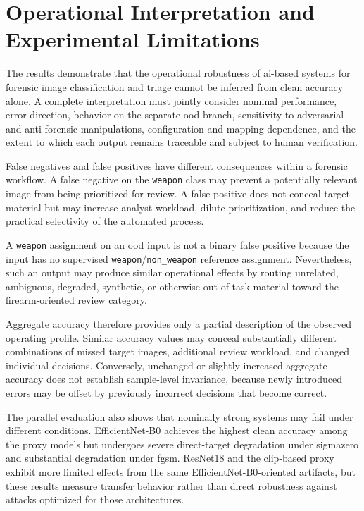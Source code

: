 \section{Operational Interpretation and Experimental Limitations}
\label{sec:results-limitations}

The results demonstrate that the operational robustness of \gls{ai}-based
systems for forensic image classification and triage cannot be inferred from
clean accuracy alone. A complete interpretation must jointly consider nominal
performance, error direction, behavior on the separate \gls{ood} branch,
sensitivity to adversarial and anti-forensic manipulations, configuration and
mapping dependence, and the extent to which each output remains traceable and
subject to human verification.

False negatives and false positives have different consequences within a
forensic workflow. A false negative on the \texttt{weapon} class may prevent a
potentially relevant image from being prioritized for review. A false positive
does not conceal target material but may increase analyst workload, dilute
prioritization, and reduce the practical selectivity of the automated process.

A \texttt{weapon} assignment on an \gls{ood} input is not a binary false
positive because the input has no supervised
\texttt{weapon}/\texttt{non\_weapon} reference assignment. Nevertheless, such
an output may produce similar operational effects by routing unrelated,
ambiguous, degraded, synthetic, or otherwise out-of-task material toward the
firearm-oriented review category.

Aggregate accuracy therefore provides only a partial description of the
observed operating profile. Similar accuracy values may conceal substantially
different combinations of missed target images, additional review workload,
and changed individual decisions. Conversely, unchanged or slightly increased
aggregate accuracy does not establish sample-level invariance, because newly
introduced errors may be offset by previously incorrect decisions that become
correct.

The parallel evaluation also shows that nominally strong systems may fail under
different conditions. EfficientNet-B0 achieves the highest clean accuracy among
the proxy models but undergoes severe direct-target degradation under
\gls{sigmazero} and substantial degradation under \gls{fgsm}. ResNet18 and the
\gls{clip}-based proxy exhibit more limited effects from the same
EfficientNet-B0-oriented artifacts, but these results measure transfer behavior
rather than direct robustness against attacks optimized for those
architectures.

